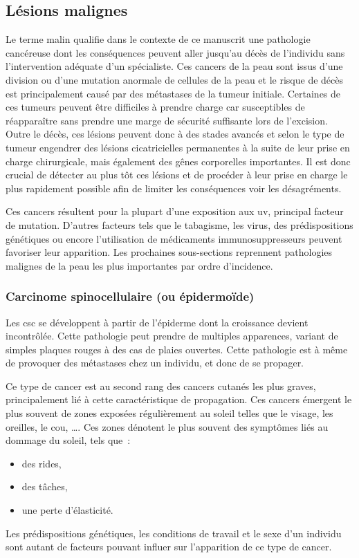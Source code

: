 \subsection{Lésions malignes}
Le terme malin qualifie dans le contexte de ce manuscrit une pathologie cancéreuse dont les conséquences peuvent aller jusqu'au décès de l'individu sans l'intervention adéquate d'un spécialiste. Ces cancers de la peau sont issus d’une division ou d’une mutation anormale de cellules de la peau et le risque de décès est principalement causé par des métastases de la tumeur initiale. Certaines de ces tumeurs peuvent être difficiles à prendre charge car susceptibles de réapparaître sans prendre une marge de sécurité suffisante lors de l'excision. Outre le décès, ces lésions peuvent donc à des stades avancés et selon le type de tumeur engendrer des lésions cicatricielles permanentes à la suite de leur prise en charge chirurgicale, mais également des gênes corporelles importantes. Il est donc crucial de détecter au plus tôt ces lésions et de procéder à leur prise en charge le plus rapidement possible afin de limiter les conséquences voir les désagréments.\par

Ces cancers résultent pour la plupart d’une exposition aux \gls{uv}, principal facteur de mutation. D’autres facteurs tels que le tabagisme, les virus, des prédispositions génétiques ou encore l’utilisation de médicaments immunosuppresseurs peuvent favoriser leur apparition. Les prochaines sous-sections reprennent pathologies malignes de la peau les plus importantes par ordre d'incidence.\par

\subsubsection{Carcinome spinocellulaire (ou épidermoïde)}
Les \gls{csc} se développent à partir de l'épiderme dont la croissance devient incontrôlée. Cette pathologie peut prendre de multiples apparences, variant de simples plaques rouges à des cas de plaies ouvertes. Cette pathologie est à même de provoquer des métastases chez un individu, et donc de se propager.\par

Ce type de cancer est au second rang des cancers cutanés les plus graves, principalement lié à cette caractéristique de propagation. Ces cancers émergent le plus souvent de zones exposées régulièrement au soleil telles que le visage, les oreilles, le cou, \ldots. Ces zones dénotent le plus souvent des symptômes liés au dommage du soleil, tels que~:
\begin{itemize}
    \item des rides,
    \item des tâches,
    \item une perte d’élasticité.
\end{itemize}
Les prédispositions génétiques, les conditions de travail et le sexe d’un individu sont autant de facteurs pouvant influer sur l’apparition de ce type de cancer.\par


